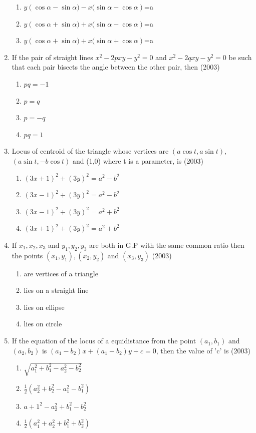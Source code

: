 \documentclass[12pt]{article}
\providecommand{\brak}[1]{\ensuremath{\left(#1\right)}}
\begin{document}
\begin{enumerate}
\begin{enumerate}
\item $y\brak{\cos\alpha-\sin\alpha)-x(\sin\alpha-\cos\alpha}$=a
\item $y\brak{\cos\alpha+\sin\alpha)+x(\sin\alpha-\cos\alpha}$=a
\item $y\brak{\cos\alpha+\sin\alpha)+x(\sin\alpha+\cos\alpha}$=a
\end{enumerate}
\item If the pair of straight lines $x^2-2pxy-y^2=0$ and $x^2-2qxy-y^2=0$ be such that each pair bisects the angle between the other pair, then (2003)
\begin{enumerate}
\item $pq=-1$  
\item $p=q$ 
\item $p=-q$  
\item $pq=1$
\end{enumerate}
\item Locus of centroid of the triangle whose vertices are $(a\cos t, a\sin t)$, $(a\sin t,-b\cos t)$ and (1,0) where t is a parameter, is (2003)
\begin{enumerate}
\item $(3x+1)^2+(3y)^2=a^2-b^2$
\item $(3x-1)^2+(3y)^2=a^2-b^2$
\item $(3x-1)^2+(3y)^2=a^2+b^2$
\item $(3x+1)^2+(3y)^2=a^2+b^2$
\end{enumerate}
\item If $x_1,x_2,x_3$ and $y_1,y_2,y_3$ are both in G.P with the same common ratio then the points $(x_1,y_1),(x_2,y_2)$ and $(x_3,y_3)$ (2003)
\begin{enumerate}
\item are vertices of a triangle
\item lies on a straight line
\item lies on ellipse
\item lies on circle
\end{enumerate}
\item If the equation of the locus of a equidistance from the point $(a_1,b_1)$ and $(a_2,b_2)$ is $(a_1-b_2)x+(a_1-b_2)y+c=0$, then the value of 'c' is (2003)
\begin{enumerate}
\item $\sqrt{a_1^2+b_1^2-a_2^2-b_2^2}$
\item $\frac{1}{2}(a_2^2+b_2^2-a_1^2-b_1^2)$
\item $a+1^2-a_2^2+b_1^2-b_2^2$
\item $\frac{1}{2}(a_1^2+a_2^2+b_1^2+b_2^2)$

\end{enumerate}
\end{enumerate}
\end{document}
